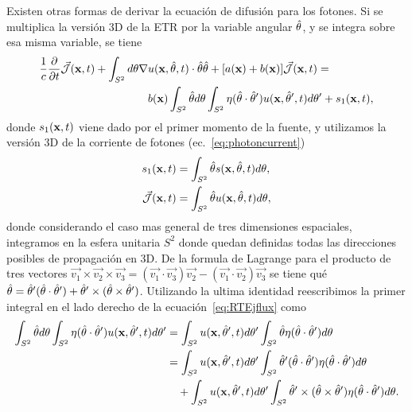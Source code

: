 Existen otras formas de derivar la ecuación de difusión para los fotones. 
Si se multiplica la versión 3D de la ETR  por la variable angular $\hat{\theta}$, y se integra 
sobre esa misma variable, se tiene
\begin{equation}
\begin{split}
\begin{aligned}
\frac{1}{c}\frac{\partial}{\partial t} \vec{ \mathcal{J}}(\mathbf{x},t)+\int_{S^2} d\theta \nabla & u(\mathbf{x},\hat{\theta},t) \cdot \hat{\theta} \hat{\theta} 
+[a(\mathbf{x})+b(\mathbf{x})]\vec{ \mathcal{J}}(\mathbf{x},t)=\\
&b(\mathbf{x})\int_{S^2} \hat{\theta} d\theta \int_{S^2} \eta(\hat{\theta} \cdot \hat{\theta}')  u(\mathbf{x},\hat{\theta}',t) d\theta' + s_1(\mathbf{x},t),
\end{aligned}
\end{split}
\label{eq:RTEjflux}
\end{equation}
donde $s_1(\mathbf{x},t)$ viene dado por el primer momento de la fuente, y utilizamos 
la versión 3D de la corriente de fotones (ec.~\eqref{eq:photoncurrent})
\begin{equation}
\begin{split}
\begin{aligned}
s_1(\mathbf{x},t)&=\int_{S^2} \hat{\theta} s(\mathbf{x},\hat{\theta},t) d\theta,\\
 \vec{ \mathcal{J}}(\mathbf{x},t)&=\int_{S^2} \hat{\theta} u(\mathbf{x},\hat{\theta},t) d\theta,
\label{eq:RTEsflux1}
\end{aligned}
\end{split}
\end{equation}
donde considerando el caso mas general de tres dimensiones espaciales, integramos en la esfera unitaria $S^2$ donde quedan definidas todas las direcciones posibles de propagación en 3D. 
De la formula de Lagrange para el producto de tres vectores $\vec{v_1} \times \vec{v_2} \times \vec{v_3}=(\vec{v_1}\cdot \vec{v_3}) \vec{v_2}-(\vec{v_1} \cdot \vec{v_2}) \vec{v_3}$ 
se tiene qué  $\hat{\theta}= \hat{\theta}'(\hat{\theta}\cdot \hat{\theta}') + \hat{\theta}' \times(\hat{\theta} \times \hat{\theta}')$.
Utilizando la ultima identidad reescribimos la primer integral en el lado derecho de la ecuación~\eqref{eq:RTEjflux} como
\begin{equation}
\begin{split}
\begin{aligned}
\int_{S^2} \hat{\theta} d\theta \int_{S^2} \eta(\hat{\theta} \cdot \hat{\theta}')  u(\mathbf{x},\hat{\theta}',t) d\theta' 
&=\int_{S^2} u(\mathbf{x},\hat{\theta}',t) d\theta'  \int_{S^2} \hat{\theta} \eta(\hat{\theta} \cdot \hat{\theta}') d\theta\\
&=\int_{S^2} u(\mathbf{x},\hat{\theta}',t) d\theta' \int_{S^2} \hat{\theta}' (\hat{\theta} \cdot \hat{\theta}') \eta(\hat{\theta} \cdot \hat{\theta}') d\theta \\&\quad+ \int_{S^2} u(\mathbf{x},\hat{\theta}',t) d\theta' \int_{S^2}  \hat{\theta}' \times(\hat{\theta} \times \hat{\theta}') \eta(\hat{\theta} \cdot \hat{\theta}') d\theta .
\end{aligned}
\end{split}
\label{eq:RTEjint}
\end{equation}
